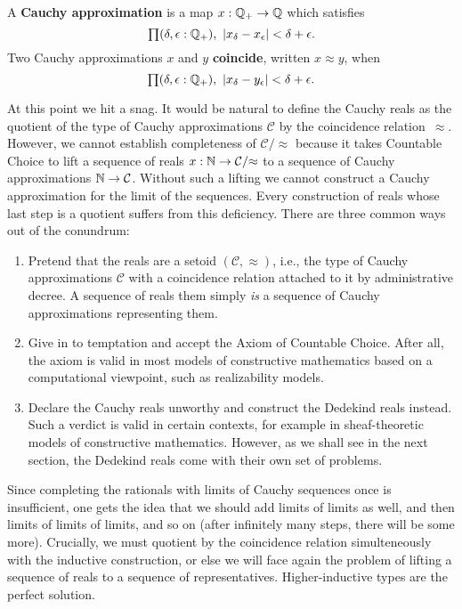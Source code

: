 \begin{defn}\label{defn:cauchy-approximation}
  A \textbf{Cauchy approximation} is a map $x : \mathbb{Q}_{+} \to \mathbb{Q}$ which satisfies
  \begin{equation}
    \label{eq:cauchy-approx}
    \prd{\delta, \epsilon :\Qp} |x_\delta - x_\epsilon| < \delta + \epsilon.
  \end{equation}
  Two Cauchy approximations $x$ and $y$ \textbf{coincide}, written $x \approx y$, when
  \begin{equation}
    \label{eq:cauchy-coincide}
    \prd{\delta, \epsilon:\Qp} |x_\delta - y_\epsilon| < \delta + \epsilon.
  \end{equation}
\end{defn}

At this point we hit a snag. It would be natural to define the Cauchy reals as the
quotient of the type of Cauchy approximations $\mathcal{C}$ by the coincidence
relation~$\approx$. However, we cannot establish completeness of $\mathcal{C}/{\approx}$
because it takes Countable Choice to lift a sequence of reals $x : \mathbb{N} \to
\mathcal{C}/{\approx}$ to a sequence of Cauchy approximations $\mathbb{N} \to \mathcal{C}$.
Without such a lifting we cannot construct a Cauchy approximation for the limit of the
sequences. Every construction of reals whose last step is a quotient suffers from this
deficiency. There are three common ways out of the conundrum:
%
\begin{enumerate}
\item Pretend that the reals are a setoid $(\mathcal{C}, {\approx})$, i.e., the type of
  Cauchy approximations $\mathcal{C}$ with a coincidence relation attached to it by
  administrative decree. A sequence of reals them simply \emph{is} a sequence of Cauchy
  approximations representing them.
\item Give in to temptation and accept the Axiom of Countable Choice. After all, the axiom
  is valid in most models of constructive mathematics based on a computational viewpoint,
  such as realizability models.
\item Declare the Cauchy reals unworthy and construct the Dedekind reals instead. Such a
  verdict is valid in certain contexts, for example in sheaf-theoretic models of
  constructive mathematics. However, as we shall see in the next section, the Dedekind
  reals come with their own set of problems.
\end{enumerate}
%
Since completing the rationals with limits of Cauchy sequences once is insufficient, one
gets the idea that we should add limits of limits as well, and then limits of limits of
limits, and so on (after infinitely many steps, there will be some more). Crucially, we
must quotient by the coincidence relation simulteneously with the inductive construction,
or else we will face again the problem of lifting a sequence of reals to a sequence of
representatives. Higher-inductive types are the perfect solution.

